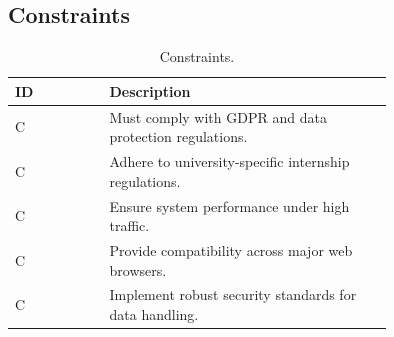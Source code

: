 \subsection{Constraints}
\label{subsec:constraints}%
\setcounter{con}{1}
\newcommand{\ccon}{\thecon\stepcounter{con}}

\begin{table}[H]
\centering
\footnotesize
\begin{tabular}{ |l|p{0.75\linewidth}| }
    \hline
    \textbf{ID} & \textbf{Description} \\
    \hline
    C\ccon & Must comply with GDPR and data protection regulations. \\
    \hline
    C\ccon & Adhere to university-specific internship regulations. \\
    \hline
    C\ccon & Ensure system performance under high traffic. \\
    \hline
    C\ccon & Provide compatibility across major web browsers. \\
    \hline
    C\ccon & Implement robust security standards for data handling. \\
    \hline
\end{tabular}
\caption{Constraints.}
\label{tab:constraints}
\end{table}
